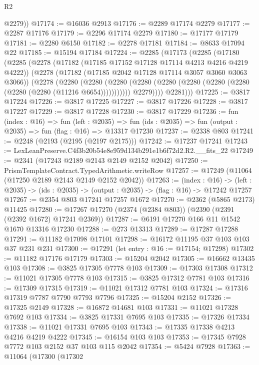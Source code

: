 \begin{lexlean}{R2}
\begin{coremodule}
        @2279))
@17174 := @16036 @2913
@17176 := @2289 @17174 @2279
@17177 := @2287 @17176
@17179 := @2296 @17174 @2279
@17180 := @17177 @17179
@17181 := @2280 @6150
@17182 := @2278 @17181
@17184 := @8633 @17094 @22
@17185 := @15194 @17184
@17224 := @2285
    (@17173
      (@2285
        (@17180
          (@2285
            (@2278
              (@17182 (@17185 @17152 @17128 @17114 @4213 @4216 @4219 @4222))
              (@2278
                (@17182 (@17185 @2042 @17128 @17114 @3057 @3060 @3063 @3066))
                (@2278
                  (@2280
                    (@2280
                      (@2280
                        (@2280 (@2280 (@2280 (@2280 (@2280 (@2280 (@2280 (@11216 @6654)))))))))))
                  @2279))))
          @2281)))
@17225 := @3817 @17224
@17226 := @3817 @17225
@17227 := @3817 @17226
@17228 := @3817 @17227
@17229 := @3817 @17228
@17230 := @3817 @17229
@17236 := fun (index : @16) =>
  fun (left : @2035) =>
  fun (ids : @2035) => fun (output : @2035) => fun (flag : @16) => @13317 @17230
@17237 := @2338 @803
@17241 := @2248 (@2193 (@2195 (@2197 @2175)))
@17242 := @17237 @17241
@17243 := LexLeanPreserve.C4f3b20b54e8e959d134b291e1b6f72d2.R2.__fits_22
@17249 := @2341 (@17243 @2189 @2143 @2149 @2152 @2042)
@17250 := PrismTemplateContract.TypedArithmetic.writeRow
@17257 := @17249 (@11064 (@17250 @2189 @2143 @2149 @2152 @2042))
@17263 := (index : @16) ->
  (left : @2035) -> (ids : @2035) -> (output : @2035) -> (flag : @16) -> @17242 @17257
@17267 := @2354 @803 @17241 @17257 @1672
@17270 := @2362 (@5865 @2173) @11425
@17280 := @17267 @17270 (@2374 (@2384 @803)) (@2390 (@2391 (@2392 @1672) @17241 @2369))
@17287 := @6191 @17270 @166 @11 @1542 @1670 @13316 @17230
@17288 := @273 @13313
@17289 := @17287 @17288
@17291 := @11182 @17098 @17101
@17298 := @16172 @11195 @37 @103 @103 @37 @231 @231
@17300 := @17291 (let entry : @16 := @17154; @17298)
@17302 := @11182 @17176 @17179
@17303 := @15204 @2042
@17305 := @16662 @13435 @103
@17308 := @3825 @17305 @7778 @103
@17309 := @17303 @17308
@17312 := @11021 @17305 @7778 @103
@17315 := @3825 @17312 @7781 @103
@17316 := @17309 @17315
@17319 := @11021 @17312 @7781 @103
@17324 := @17316 @17319 @7787 @7790 @7793 @7796
@17325 := @15204 @2152
@17326 := @17325 @2149
@17328 := @16872 @14681 @103
@17331 := @11021 @17328 @7692 @103
@17334 := @3825 @17331 @7695 @103
@17335 := @17326 @17334
@17338 := @11021 @17331 @7695 @103
@17343 := @17335 @17338 @4213 @4216 @4219 @4222
@17345 := @16154 @103 @103
@17353 := @17345 @7928 @7772 @103 @2152 @37 @103 @115 @2042
@17354 := @5424 @7928
@17363 := @11064
    (@17300
      (@17302

\end{coremodule}
\end{lexlean}
